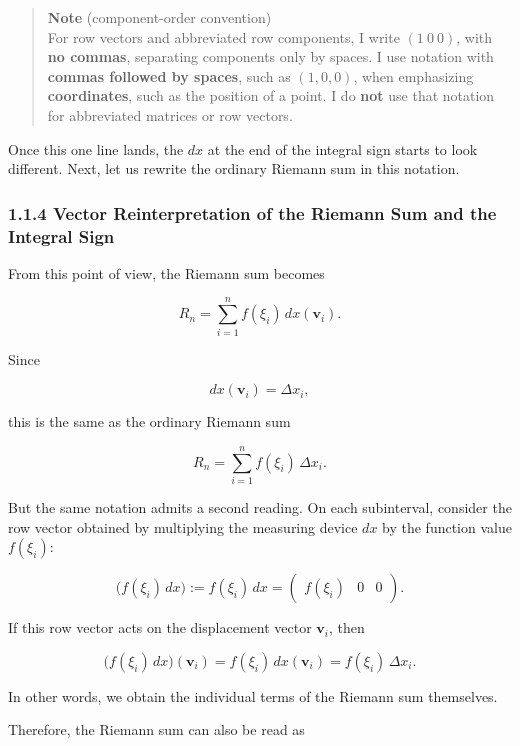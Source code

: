 \documentclass[a4paper,12pt,openany]{book}
\begin{document}
\begin{quote}
\textbf{Note} (component-order convention)\\
For row vectors and abbreviated row components, I write \((1\ 0\ 0)\),
with \textbf{no commas}, separating components only by spaces. I use
notation with \textbf{commas followed by spaces}, such as \((1, 0, 0)\),
when emphasizing \textbf{coordinates}, such as the position of a point.
I do \textbf{not} use that notation for abbreviated matrices or row
vectors.
\end{quote}

Once this one line lands, the \(dx\) at the end of the integral sign
starts to look different. Next, let us rewrite the ordinary Riemann sum
in this notation.

\hypertarget{vector-reinterpretation-of-the-riemann-sum-and-the-integral-sign}{%
\subsubsection{1.1.4 Vector Reinterpretation of the Riemann Sum and the
Integral
Sign}\label{vector-reinterpretation-of-the-riemann-sum-and-the-integral-sign}}

From this point of view, the Riemann sum becomes

\[
R_n
=
\sum_{i=1}^n f(\xi_i)\,dx(\mathbf{v}_i).
\]

Since

\[
dx(\mathbf{v}_i)=\Delta x_i,
\]

this is the same as the ordinary Riemann sum

\[
R_n
=
\sum_{i=1}^n f(\xi_i)\,\Delta x_i.
\]

But the same notation admits a second reading. On each subinterval,
consider the row vector obtained by multiplying the measuring device
\(dx\) by the function value \(f(\xi_i)\):

\[
\bigl(f(\xi_i)\,dx\bigr)
:=
f(\xi_i)\,dx
=
\begin{pmatrix}
f(\xi_i) & 0 & 0
\end{pmatrix}.
\]

If this row vector acts on the displacement vector \(\mathbf{v}_i\),
then

\[
\bigl(f(\xi_i)\,dx\bigr)(\mathbf{v}_i)
=
f(\xi_i)\,dx(\mathbf{v}_i)
=
f(\xi_i)\,\Delta x_i.
\]

In other words, we obtain the individual terms of the Riemann sum
themselves.

Therefore, the Riemann sum can also be read as
\end{document}

